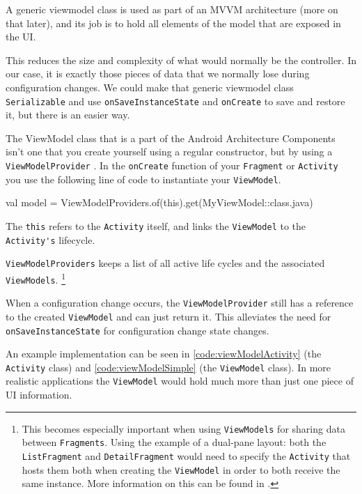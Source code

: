 A generic viewmodel class is used as part of an MVVM architecture (more on that later), and its job is to hold all elements of the model that are exposed in the UI.

This reduces the size and complexity of what would normally be the controller.
In our case, it is exactly those pieces of data that we normally lose during configuration changes.
We could make that generic viewmodel class \lstinline!Serializable! and use \lstinline!onSaveInstanceState! and \lstinline!onCreate! to save and restore it, but there is an easier way. 

The ViewModel class that is a part of the Android Architecture Components isn't one that you create yourself using a regular constructor, but by using a \lstinline!ViewModelProvider! \cite{viewModelProvider}.
In the \lstinline!onCreate! function of your \lstinline!Fragment! or \lstinline!Activity! you use the following line of code to instantiate your \lstinline!ViewModel!.


\begin{android}
val model = ViewModelProviders.of(this).get(MyViewModel::class.java)	
\end{android}

The \lstinline!this! refers to the \lstinline!Activity! itself, and links the \lstinline!ViewModel! to the \lstinline!Activity's! lifecycle.

\lstinline!ViewModelProviders! keeps a list of all active life cycles and the associated \lstinline!ViewModels!.
\footnote{This becomes especially important when using \lstinline!ViewModels! for sharing data between \lstinline!Fragments!.
Using the example of a dual-pane layout: both the \lstinline!ListFragment! and \lstinline!DetailFragment! would need to specify the \lstinline!Activity! that hosts them both when creating the \lstinline!ViewModel! in order to both receive the same instance. 
More information on this can be found in \cite{shareDataBetweenFragments}.}

When a configuration change occurs, the \lstinline!ViewModelProvider! still has a reference to the created \lstinline!ViewModel! and can just return it.
This alleviates the need for \lstinline!onSaveInstanceState! for configuration change state changes. 

An example implementation can be seen in \ref{code:viewModelActivity} (the \lstinline!Activity! class) and \ref{code:viewModelSimple} (the \lstinline!ViewModel! class).
In more realistic applications the \lstinline!ViewModel! would hold much more than just one piece of UI information.

